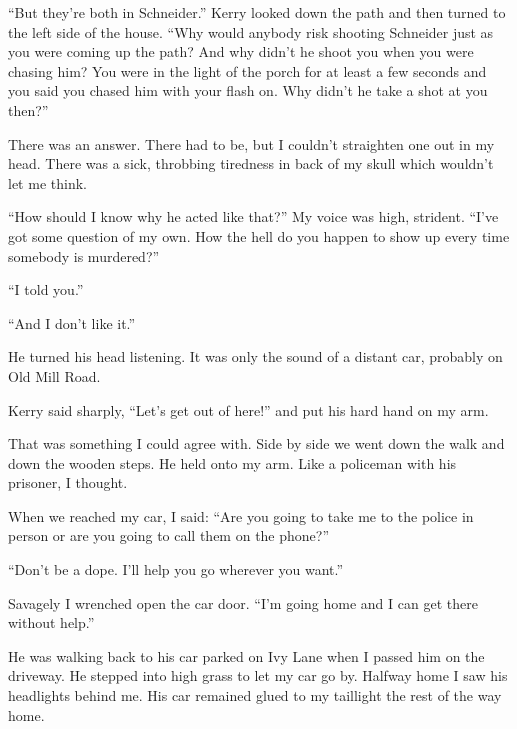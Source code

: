 {“But they’re both in Schneider.” Kerry looked down the path and then turned to the left side of the house. “Why would anybody risk shooting Schneider just as you were coming up the path? And why didn’t he shoot you when you were chasing him? You were in the light of the porch for at least a few seconds and you said you chased him with your flash on. Why didn’t he take a shot at you then?”

There was an answer. There had to be, but I couldn’t straighten one out in my head. There was a sick, throbbing tiredness in back of my skull which wouldn’t let me think.

“How should I know why he acted like that?” My voice was high, strident. “I’ve got some question of my own. How the hell do you happen to show up every time somebody is murdered?”

“I told you.”

“And I don’t like it.”

He turned his head listening. It was only the sound of a distant car, probably on Old Mill Road.

Kerry said sharply, “Let’s get out of here!” and put his hard hand on my arm.

That was something I could agree with. Side by side we went down the walk and down the wooden steps. He held onto my arm. Like a policeman with his prisoner, I thought.

When we reached my car, I said: “Are you going to take me to the police in person or are you going to call them on the phone?”

“Don’t be a dope. I’ll help you go wherever you want.”

Savagely I wrenched open the car door. “I’m going home and I can get there without help.”

He was walking back to his car parked on Ivy Lane when I passed him on the driveway. He stepped into high grass to let my car go by. Halfway home I saw his headlights behind me. His car remained glued to my taillight the rest of the way home.

}

\vspace{2\nbs}
\clearpage
\thispagestyle{empty}


